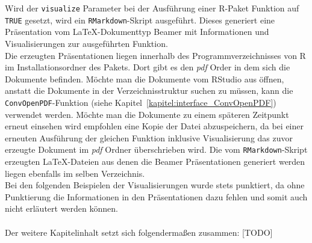 Wird der \texttt{visualize} Parameter bei der Ausführung einer R-Paket Funktion auf \texttt{TRUE} gesetzt, wird ein \texttt{RMarkdown}-Skript ausgeführt. Dieses generiert eine  Präsentation vom \LaTeX -Dokumenttyp Beamer mit Informationen und Visualisierungen zur ausgeführten Funktion.
\\
Die erzeugten Präsentationen liegen innerhalb des Programmverzeichnisses von R im Installationsordner des Pakets. Dort gibt es den \emph{pdf} Order in dem sich die Dokumente befinden. Möchte man die Dokumente vom RStudio aus öffnen, anstatt die Dokumente in der Verzeichnisstruktur suchen zu müssen, kann die \texttt{ConvOpenPDF}-Funktion (siehe Kapitel~\ref{kapitel:interface_ConvOpenPDF}) verwendet werden. Möchte man die Dokumente zu einem späteren Zeitpunkt erneut einsehen wird empfohlen eine Kopie der Datei abzuspeichern, da bei einer erneuten Ausführung der gleichen Funktion inklusive Visualisierung das zuvor erzeugte Dokument im \emph{pdf} Ordner überschrieben wird. Die vom \texttt{RMarkdown}-Skript erzeugten \LaTeX -Dateien aus denen die Beamer Präsentationen generiert werden liegen ebenfalls im selben Verzeichnis.
\\
Bei den folgenden Beispielen der Visualisierungen wurde stets punktiert, da ohne Punktierung die Informationen in den Präsentationen dazu fehlen und somit auch nicht erläutert werden können.
\\
\\
Der weitere Kapitelinhalt setzt sich folgendermaßen zusammen: [TODO]
